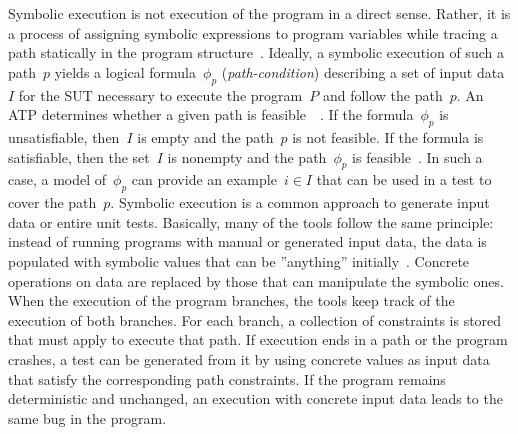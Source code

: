 \documentclass{article}
\begin{document}
Symbolic execution is not execution of the program in a direct sense. Rather, it is a process of assigning symbolic expressions to program variables while tracing a path statically in the program structure~\cite{McMinn_2004}. Ideally, a symbolic execution of such a path~$p$ yields a logical formula~$\phi_{p}$ (\textit{path-condition}) describing a set of input data~$I$ for the \ac{SUT} necessary to execute the program~$P$ and follow the path~$p$. An \ac{ATP} determines whether a given path is feasible~~\cite{Clarke1976,King1976}. If the formula~$\phi_{p}$ is unsatisfiable, then~$I$ is empty and the path~$p$ is not feasible. If the formula is satisfiable, then the set~$I$ is nonempty and the path~$\phi_{p}$ is feasible~\cite{Ball2015}. In such a case, a model of~$\phi_{p}$ can provide an example~$i \in I$ that can be used in a test to cover the path~$p$. Symbolic execution is a common approach to generate input data or entire unit tests. Basically, many of the tools follow the same principle: instead of running programs with manual or generated input data, the data is populated with symbolic values that can be ''anything'' initially~\cite{cadar2008klee}. Concrete operations on data are replaced by those that can manipulate the symbolic ones. When the execution of the program branches, the tools keep track of the execution of both branches. For each branch, a collection of constraints is stored that must apply to execute that path. If execution ends in a path or the program crashes, a test can be generated from it by using concrete values as input data that satisfy the corresponding path constraints. If the program remains deterministic and unchanged, an execution with concrete input data leads to the same bug in the program. 

\end{document}
